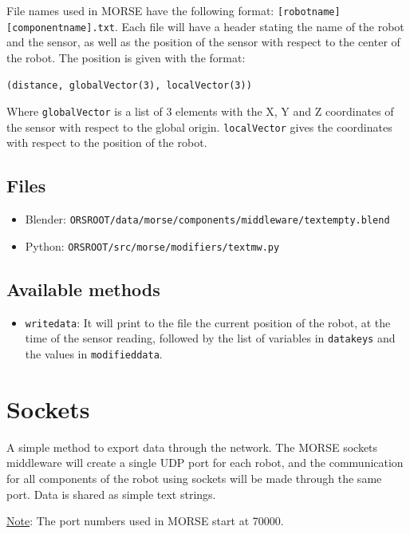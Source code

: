 \documentclass[twoside,a4paper,10pt]{report}
\newcommand{\dokutitlelevelone}[1]{\chapter{#1}}
\newcommand{\dokutitleleveltwo}[1]{\section{#1}}
\newcommand{\dokumonospace}[1]{\texttt{#1}}
\newcommand{\dokuunderline}[1]{\underline{#1}}
\newcommand{\dokuitem}{\item}
\begin{document}
File names used in MORSE have the following format: \dokumonospace{[robot{\textunderscore}name]{\textunderscore}[component{\textunderscore}name].txt}. Each file will have a header stating the name of the robot and the sensor, as well as the position of the sensor with respect to the center of the robot. The position is given with the format:


\lstset{language=python}
\begin{lstlisting}
(distance, globalVector(3), localVector(3))

\end{lstlisting}
Where \dokumonospace{globalVector} is a list of 3 elements with the X, Y and Z coordinates of the sensor with respect to the global origin. \dokumonospace{localVector} gives the coordinates with respect to the position of the robot.


\dokutitleleveltwo{Files}
\label{45b963397aa40d4a0063e0d85e4fe7a1}%

\begin{itemize}
\dokuitem  Blender: \dokumonospace{{\textdollar}ORS{\textunderscore}ROOT/data/morse/components/middleware/text{\textunderscore}empty.blend}
\dokuitem  Python: \dokumonospace{{\textdollar}ORS{\textunderscore}ROOT/src/morse/modifiers/text{\textunderscore}mw.py}
\end{itemize}

\dokutitleleveltwo{Available methods}
\label{a2d06dcb42bbd0519b19166fd7f36cea}%

\begin{itemize}
\dokuitem  \dokumonospace{write{\textunderscore}data}: It will print to the file the current position of the robot, at the time of the sensor reading, followed by the list of variables in \dokumonospace{data{\textunderscore}keys} and the values in \dokumonospace{modified{\textunderscore}data}.
\end{itemize}

\dokutitlelevelone{Sockets}
\label{ffe33a3f6e35505faba01d17fd07d641}%
\label{61f2529360aec54f5dc9804b842cf3fa}%
A simple method to export data through the network. The MORSE sockets middleware will create a single UDP port for each robot, and the communication for all components of the robot using sockets will be made through the same port.
Data is shared as simple text strings.

\dokuunderline{Note}: The port numbers used in MORSE start at 70000.
\end{document}
